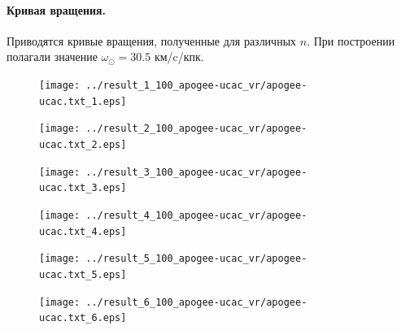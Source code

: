 \documentclass{matmex-diploma-custom}
\begin{document}
\pagebreak
\paragraph{Кривая вращения.} Приводятся кривые вращения, полученные для различных $n$. При построении полагали значение $\omega_{\odot} = 30.5$ км/c/кпк.
\begin{figure}[h!]
\begin{minipage}[h]{0.49\linewidth}
        \texttt{[image: ../result\_1\_100\_apogee-ucac\_vr/apogee-ucac.txt\_1.eps]}
\end{minipage}
\hfill
\begin{minipage}[h]{0.49\linewidth}
        \texttt{[image: ../result\_2\_100\_apogee-ucac\_vr/apogee-ucac.txt\_2.eps]}
\end{minipage}
\end{figure}
\begin{figure}[h!]
\begin{minipage}[h]{0.49\linewidth}
        \texttt{[image: ../result\_3\_100\_apogee-ucac\_vr/apogee-ucac.txt\_3.eps]}
\end{minipage}
\hfill
\begin{minipage}[h]{0.49\linewidth}
        \texttt{[image: ../result\_4\_100\_apogee-ucac\_vr/apogee-ucac.txt\_4.eps]}
\end{minipage}
\end{figure}
\begin{figure}[h!]
\begin{minipage}[h]{0.49\linewidth}
        \texttt{[image: ../result\_5\_100\_apogee-ucac\_vr/apogee-ucac.txt\_5.eps]}
\end{minipage}
\hfill
\begin{minipage}[h]{0.49\linewidth}
        \texttt{[image: ../result\_6\_100\_apogee-ucac\_vr/apogee-ucac.txt\_6.eps]}
\end{minipage}
\end{figure}


\pagebreak
\end{document}
